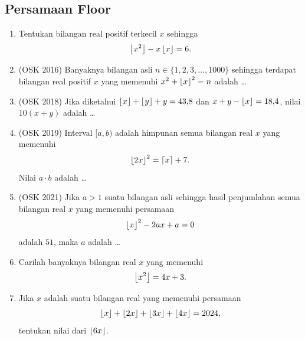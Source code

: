 \documentclass[12pt]{scrartcl}
\providecommand{\sumber}[1]{(#1)}
\begin{document}
\subsection{Persamaan Floor}
\begin{enumerate}[resume]

	\item
	Tentukan bilangan real positif terkecil $x$ sehingga
	\[ \left\lfloor x^2 \right\rfloor - x\left\lfloor x \right\rfloor = 6. \]

	\item \sumber{OSK 2016}
	Banyaknya bilangan asli $n \in \{1, 2, 3, \dots, 1000\}$
	sehingga terdapat bilangan real positif $x$ yang memenuhi
	$x^2 + \left\lfloor x \right\rfloor^2 = n$ adalah \dots

	\item \sumber{OSK 2018}
	Jika diketahui $\left\lfloor x \right\rfloor + \left\lfloor y \right\rfloor + y = 43{,}8$ dan
	$x + y - \left\lfloor x \right\rfloor = 18{,}4$,
	nilai $10(x + y)$ adalah \dots

	\item \sumber{OSK 2019}
	Interval $[a, b)$ adalah himpunan semua bilangan real $x$ yang memenuhi
	\[ \left\lfloor 2x \right\rfloor^2 = \left\lceil x \right\rceil + 7. \]
	Nilai $a \cdot b$ adalah \dots

	\item \sumber{OSK 2021}
	Jika $a > 1$ suatu bilangan asli sehingga hasil penjumlahan semua
	bilangan real $x$ yang memenuhi persamaan
	\[ \left\lfloor x \right\rfloor^2 - 2ax + a = 0 \]
	adalah $51$, maka $a$ adalah \dots

	\item
	Carilah banyaknya bilangan real $x$ yang memenuhi
	\[ \left\lfloor x^2 \right\rfloor = 4x + 3. \]

	\item
	Jika $x$ adalah suatu bilangan real yang memenuhi persamaan
	\[ \left\lfloor x \right\rfloor + \left\lfloor 2x \right\rfloor + \left\lfloor 3x \right\rfloor + \left\lfloor 4x \right\rfloor = 2024, \]
	tentukan nilai dari $\left\lfloor 6x \right\rfloor$.


\end{enumerate}
\end{document}
